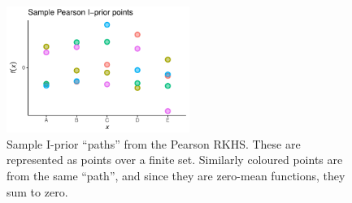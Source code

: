 \begin{figure}[hbt]
  \centering
  \includegraphics[width=0.53\textwidth]{figure/02-kernel_path_pearson}
  \caption[Sample I-prior ``paths'' from the Pearson RKHS]{Sample I-prior ``paths'' from the Pearson RKHS. These are represented as points over a finite set. Similarly coloured points are from the same ``path'', and since they are zero-mean functions, they sum to zero.}
\end{figure}

